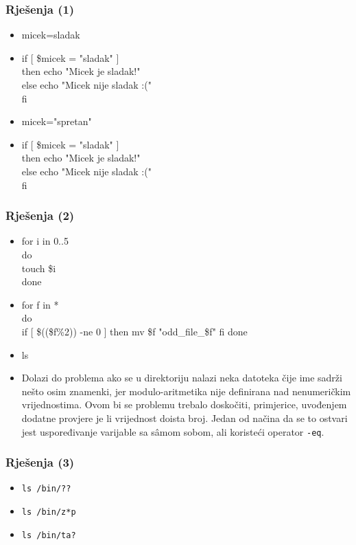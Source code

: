 \documentclass[table,usenames,dvipsnames]{beamer}
\newcommand{\shell}[1]{\texttt{#1}}
\begin{document}
\begin{frame}[t]
\frametitle{Rješenja (1)}
\begin{itemize}
  \item micek=sladak
  \item if [ \$micek = "sladak" ] \\
          then echo "Micek je sladak!" \\
          else echo "Micek nije sladak :(" \\
        fi
  \item micek="spretan"
  \item if [ \$micek = "sladak" ] \\
          then echo "Micek je sladak!" \\
          else echo "Micek nije sladak :(" \\
        fi
\end{itemize}
\end{frame}


\begin{frame}[t]
\frametitle{Rješenja (2)}
\begin{itemize}
  \item for i in {0..5} \\
        do \\
          touch \$i \\
        done
  \item for f in * \\
        do \\
          if [ \$((\$f\%2)) -ne 0 ]
          then
            mv \$f "odd\_file\_\$f"
          fi
        done
  \item ls
  \vfill
  \item Dolazi do problema ako se u direktoriju nalazi neka datoteka čije ime sadrži nešto osim znamenki, jer modulo-aritmetika nije definirana nad nenumeričkim vrijednostima. Ovom bi se problemu trebalo doskočiti, primjerice, uvođenjem dodatne provjere je li vrijednost doista broj. Jedan od načina da se to ostvari jest uspoređivanje varijable sa sâmom sobom, ali koristeći operator \shell{-eq}.
  
\end{itemize}
\end{frame}


\begin{frame}[t]
\frametitle{Rješenja (3)}
\begin{itemize}
	\item \shell{ls /bin/??}
	\item \shell{ls /bin/z*p}
	\item \shell{ls /bin/ta?}
\end{itemize}
\end{frame}
\end{document}
